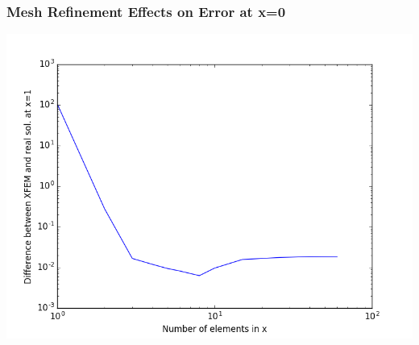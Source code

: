 \documentclass[]{beamer}
\begin{document}
\begin{frame}[t]\frametitle{Mesh Refinement Effects on Error at x=0}
	\begin{center}
		\includegraphics[scale=0.4]{figures/1D_rz_ls1mat_neumann_comp}
	\end{center}
\end{frame}
\end{document}
